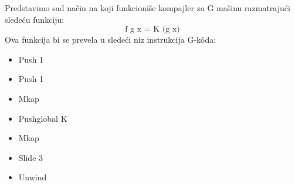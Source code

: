 \begin{primer}
	Predstavimo sad način na koji funkcioniše kompajler za G mašinu razmatrajući sledeću funkciju:
	$$\text{f g x = K (g x)}$$
	Ova funkcija bi se prevela u sledeći niz instrukcija G-k\^oda:
	\begin{itemize}
	\item Push 1
	\item Push 1
	\item Mkap
	\item Pushglobal K
	\item Mkap
	\item Slide 3
	\item Unwind
	\end{itemize}
\end{primer}

